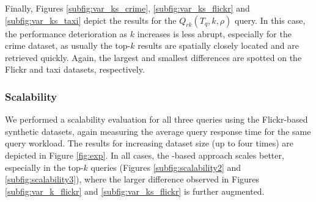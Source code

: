 
Finally, Figures \ref{subfig:var_ks_crime}, \ref{subfig:var_ks_flickr} and \ref{subfig:var_ks_taxi} depict the results for the $Q_{rk}(T_q, k, \rho)$ query. In this case, the performance deterioration as $k$ increases is less abrupt, especially for the crime dataset, as usually the top-$k$ results are spatially closely located and are retrieved quickly. Again, the largest and smallest differences are spotted on the Flickr and taxi datasets, respectively.

\subsubsection{Scalability}
\label{subsec:scalability}
We performed a scalability evaluation for all three queries using the Flickr-based synthetic datasets, again measuring the average query response time for the same query workload. The results for increasing dataset size (up to four times) are depicted in Figure \ref{fig:exp}. In all cases, the \sbtsr-based approach scales better, especially in the top-$k$ queries (Figures \ref{subfig:scalability2} and \ref{subfig:scalability3}), where the larger difference observed in Figures \ref{subfig:var_k_flickr} and \ref{subfig:var_ks_flickr} is further augmented.

